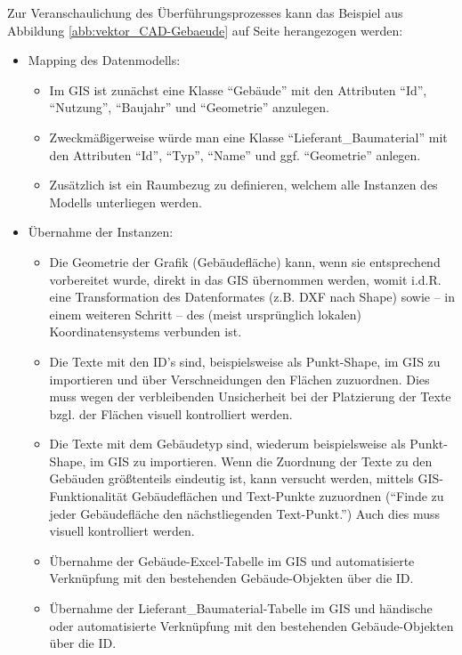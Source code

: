 Zur Veranschaulichung des Überführungsprozesses kann das Beispiel aus Abbildung \ref{abb:vektor_CAD-Gebaeude} auf Seite \pageref{abb:vektor_CAD-Gebaeude} herangezogen werden:
\begin{itemize}
	\item Mapping des Datenmodells:
	\begin{itemize}
		\item Im GIS ist zunächst eine Klasse "`Gebäude"' mit den Attributen "`Id"', "`Nutzung"', "`Baujahr"' und "`Geometrie"' anzulegen.
		\item Zweckmäßigerweise würde man eine Klasse "`Lieferant\_Baumaterial"'  mit den Attributen "`Id"', "`Typ"', "`Name"' und ggf. "`Geometrie"' anlegen.
		\item Zusätzlich ist ein Raumbezug zu definieren, welchem alle Instanzen des Modells unterliegen werden.
	\end{itemize}
	\item Übernahme der Instanzen:
	\begin{itemize}
		\item Die Geometrie der Grafik (Gebäudefläche) kann, wenn sie entsprechend vorbereitet wurde, direkt in das GIS übernommen werden, womit i.d.R. eine Transformation des Datenformates (z.B. DXF nach Shape) sowie -- in einem weiteren Schritt -- des (meist ursprünglich lokalen) Koordinatensystems verbunden ist.
		\item Die Texte mit den ID’s sind, beispielsweise als Punkt-Shape, im GIS zu importieren und über Verschneidungen den Flächen zuzuordnen. Dies muss wegen der verbleibenden Unsicherheit bei der Platzierung der Texte bzgl. der Flächen visuell kontrolliert werden.
		\item Die Texte mit dem Gebäudetyp sind, wiederum beispielsweise als Punkt-Shape, im GIS zu importieren. Wenn die Zuordnung der Texte zu den Gebäuden größtenteils eindeutig ist, kann versucht werden, mittels GIS-Funktionalität Gebäudeflächen und Text-Punkte zuzuordnen ("`Finde zu jeder Gebäudefläche den nächstliegenden Text-Punkt."') Auch dies muss visuell kontrolliert werden.
		\item Übernahme der Gebäude-Excel-Tabelle im GIS und automatisierte Verknüpfung mit den bestehenden Gebäude-Objekten über die ID.
		\item Übernahme der Lieferant\_Baumaterial-Tabelle im GIS und händische oder automatisierte Verknüpfung mit den bestehenden Gebäude-Objekten über die ID.
	\end{itemize}
\end{itemize}

